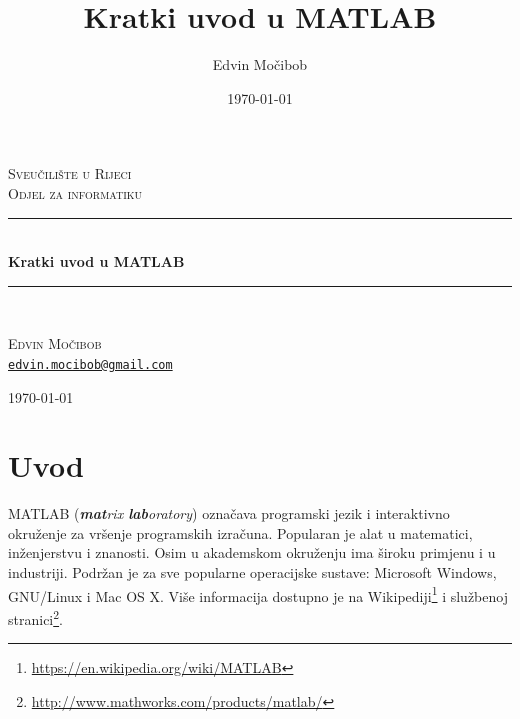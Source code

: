 \documentclass[a4paper, 10pt]{article}
\title{Kratki uvod u MATLAB}
\author{Edvin Močibob}
\date{\today}
\newcommand{\eng}[1]{\emph{#1}} %
\begin{document}

\begin{titlepage}
\newcommand{\HRule}{\rule{\linewidth}{0.5mm}}
\begin{center}

\textsc{\LARGE Sveučilište u Rijeci}\\[0.5cm]
\textsc{\Large Odjel za informatiku}\\[2.5cm]

\HRule \\[0.4cm]
{\huge \bfseries Kratki uvod u MATLAB}\\[0.1cm]

\HRule \\[1.5cm]

\begin{minipage}{0.5\textwidth}
	\begin{center}
		\large
		\textsc{\Large Edvin Močibob}\\[0.1cm]
		\href{mailto:edvin.mocibob@gmail.com}{\nolinkurl{edvin.mocibob@gmail.com}}
	\end{center}
\end{minipage}

\vfill
{\large \today}
\end{center}
\end{titlepage}


\tableofcontents
\clearpage


\section*{Uvod}

MATLAB (\eng{\textbf{mat}rix \textbf{lab}oratory}) označava programski jezik i interaktivno okruženje za vršenje programskih izračuna.
Popularan je alat u matematici, inženjerstvu i znanosti.
Osim u akademskom okruženju ima široku primjenu i u industriji.
Podržan je za sve popularne operacijske sustave: Microsoft Windows, GNU/Linux i Mac OS X.
Više informacija dostupno je na Wikipediji\footnote{\url{https://en.wikipedia.org/wiki/MATLAB}} i službenoj stranici\footnote{\url{http://www.mathworks.com/products/matlab/}}.
\end{document}
